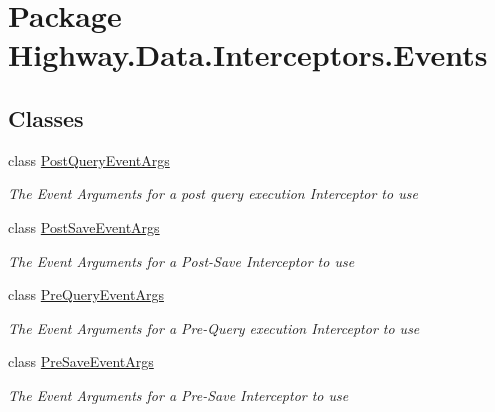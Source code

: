 \hypertarget{namespace_highway_1_1_data_1_1_interceptors_1_1_events}{\section{Package Highway.\-Data.\-Interceptors.\-Events}
\label{namespace_highway_1_1_data_1_1_interceptors_1_1_events}
}
\subsection*{Classes}
\begin{DoxyCompactItemize}
\item 
class \hyperlink{class_highway_1_1_data_1_1_interceptors_1_1_events_1_1_post_query_event_args}{Post\-Query\-Event\-Args}
\begin{DoxyCompactList}\small\item\em The Event Arguments for a post query execution Interceptor to use \end{DoxyCompactList}\item 
class \hyperlink{class_highway_1_1_data_1_1_interceptors_1_1_events_1_1_post_save_event_args}{Post\-Save\-Event\-Args}
\begin{DoxyCompactList}\small\item\em The Event Arguments for a Post-\/\-Save Interceptor to use \end{DoxyCompactList}\item 
class \hyperlink{class_highway_1_1_data_1_1_interceptors_1_1_events_1_1_pre_query_event_args}{Pre\-Query\-Event\-Args}
\begin{DoxyCompactList}\small\item\em The Event Arguments for a Pre-\/\-Query execution Interceptor to use \end{DoxyCompactList}\item 
class \hyperlink{class_highway_1_1_data_1_1_interceptors_1_1_events_1_1_pre_save_event_args}{Pre\-Save\-Event\-Args}
\begin{DoxyCompactList}\small\item\em The Event Arguments for a Pre-\/\-Save Interceptor to use \end{DoxyCompactList}\end{DoxyCompactItemize}
